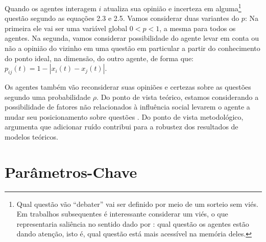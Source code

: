Quando os agentes interagem \(i\) atualiza sua opinião e incerteza em
alguma\footnote{Qual questão vão ``debater'' vai ser definido por meio de um
  sorteio sem viés. Em trabalhos subsequentes é interessante considerar um viés,
  o que representaria saliência no sentido dado por
  : qual questão os agentes estão dando atenção,
  isto é, qual questão está mais acessível na memória deles.} questão segundo as
equações 2.3 e 2.5. Vamos considerar duas variantes do \(p\): Na primeira ele
vai ser uma variável global \(0 < p < 1 \), a mesma para todos os agentes. Na
segunda, vamos considerar possibilidade do agente levar em conta ou não a
opinião do vizinho em uma questão em particular a partir do conhecimento do
ponto ideal, na dimensão, do outro agente, de forma que: \(p_{ij}(t) = 1 -
|x_i(t) - x_j(t)|\).

Os agentes também vão reconsiderar suas opiniões e certezas sobre as questões
segundo uma probabilidade \(\rho\). Do ponto de vista teórico, estamos considerando
a possibilidade de fatores não relacionados à influência social levarem o agente
a mudar seu posicionamento sobre questões \cite{flache2017, lorenz2017modeling}.
Do ponto de vista metodológico,  argumenta que
adicionar ruído contribui para a robustez dos resultados de modelos teóricos.

\section{Parâmetros-Chave}

